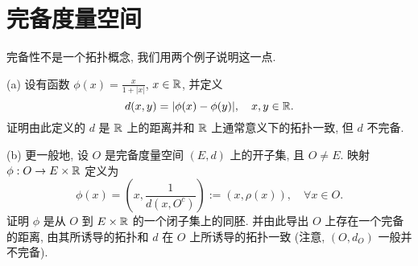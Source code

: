 \chapter{完备度量空间}
\thispagestyle{empty}



\begin{exercise}
    完备性不是一个拓扑概念, 我们用两个例子说明这一点.

    (a) 设有函数 $\phi(x)=\frac{x}{1+|x|}$, $x\in\mathbb{R}$, 并定义
    \[d(x,y)=|\phi(x)-\phi(y)|,\quad x,y\in\mathbb{R}.\]
    证明由此定义的 $d$ 是 $\mathbb{R}$ 上的距离并和 $\mathbb{R}$ 上通常意义下的拓扑一致, 但 $d$ 不完备.

    (b) 更一般地, 设 $O$ 是完备度量空间 $(E,d)$ 上的开子集, 且 $O\neq E$.
    映射 $\phi:O\to E\times\mathbb{R}$ 定义为
    \[\phi(x)=\left(x,\frac{1}{d(x,O^c)}\right):=(x,\rho(x)),\quad\forall x\in O.\]
    证明 $\phi$ 是从 $O$ 到 $E\times\mathbb{R}$ 的一个闭子集上的同胚. 并由此导出 $O$ 上存在一个完备的距离,
    由其所诱导的拓扑和 $d$ 在 $O$ 上所诱导的拓扑一致 (注意, $(O,d_O)$ 一般并不完备).
\end{exercise}

